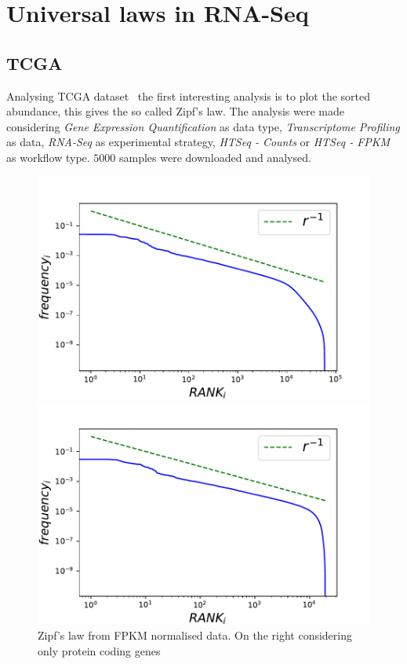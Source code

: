 \section{Universal laws in RNA-Seq}\label{sec:universallaws}
\subsection{TCGA}
Analysing TCGA dataset~\cite{grossman2016toward} the first interesting analysis is to plot the sorted abundance, this gives the so called Zipf's law. The analysis were made considering \textit{Gene Expression Quantification} as data type, \textit{Transcriptome Profiling} as data, \textit{RNA-Seq} as experimental strategy, \textit{HTSeq - Counts} or \textit{HTSeq - FPKM} as workflow type. $5000$ samples were downloaded and analysed.
\begin{figure}[htb!]
    \centering
    \begin{minipage}{0.45\textwidth}
    \includegraphics[width=0.95\linewidth]{pictures/structure/tcga/globalzipf_fpkmall.pdf}
    \end{minipage}
\hspace{3mm}
    \begin{minipage}{0.45\textwidth}
    \includegraphics[width=0.95\linewidth]{pictures/structure/tcga/globalzipf_fpkm.pdf}
    \end{minipage}
    \caption{Zipf's law from FPKM normalised data. On the right considering only protein coding genes}
    \label{fig:structure/tcga/globalZipf}
\end{figure}
